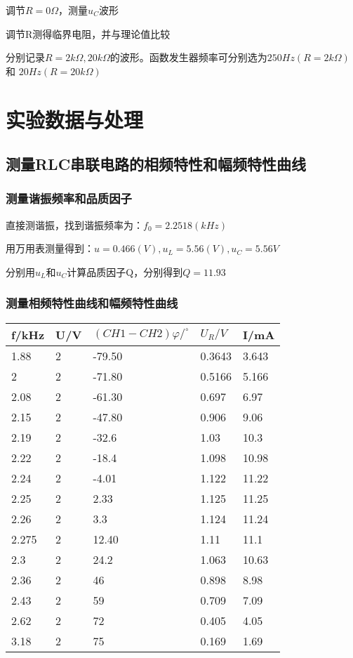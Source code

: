 \documentclass[11pt,a4paper]{article}
\begin{document}
    调节$R=0\Omega$，测量$u_C$波形

    调节R测得临界电阻，并与理论值比较
    
    分别记录$R=2k\Omega,20k\Omega$的波形。函数发生器频率可分别选为$250Hz(R=2k\Omega)$和
    $20Hz(R=20k\Omega)$

\section{实验数据与处理}
    \subsection{测量RLC串联电路的相频特性和幅频特性曲线}
    \subsubsection{测量谐振频率和品质因子}
    直接测谐振，找到谐振频率为：$f_0=2.2518(kHz)$\par
    用万用表测量得到：$u=0.466(V),u_L=5.56(V),u_C=5.56V$\par
    分别用$u_L$和$u_C$计算品质因子Q，分别得到$Q=11.93$
    \subsubsection{测量相频特性曲线和幅频特性曲线}
    \begin{table}[H]
        \centering
        \begin{tabular}{|l|l|l|l|l|}
        \hline
            f/kHz & U/V & $(CH1-CH2) \varphi/^{\circ}$ & $U_R/V$ & I/mA \\ \hline
            1.88 & 2 & -79.50 & 0.3643 & 3.643 \\ \hline
            2 & 2 & -71.80 & 0.5166 & 5.166 \\ \hline
            2.08 & 2 & -61.30 & 0.697 & 6.97 \\ \hline
            2.15 & 2 & -47.80 & 0.906 & 9.06 \\ \hline
            2.19 & 2 & -32.6 & 1.03 & 10.3 \\ \hline
            2.22 & 2 & -18.4 & 1.098 & 10.98 \\ \hline
            2.24 & 2 & -4.01 & 1.122 & 11.22 \\ \hline
            2.25 & 2 & 2.33 & 1.125 & 11.25 \\ \hline
            2.26 & 2 & 3.3 & 1.124 & 11.24 \\ \hline
            2.275 & 2 & 12.40& 1.11 & 11.1 \\ \hline
            2.3 & 2 & 24.2 & 1.063& 10.63 \\ \hline
            2.36 & 2 & 46 & 0.898 & 8.98 \\ \hline
            2.43 & 2 & 59 & 0.709 & 7.09 \\ \hline
            2.62 & 2 & 72 & 0.405 & 4.05 \\ \hline
            3.18 & 2 & 75 & 0.169 & 1.69 \\ \hline
        \end{tabular}
    \end{table}
\end{document}
